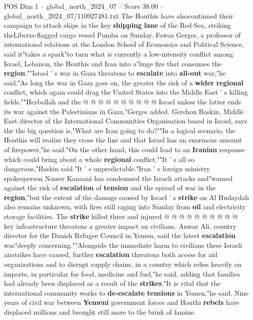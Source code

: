 \begin{textsample}{POS Dim 1 – global\_north\_2024\_07 – Score 38.00 – global\_north\_2024\_07/110927481.txt}
The Houthis have alsocontinued their campaign to attack ships in the key \textbf{shipping} \textbf{lane} of the Red Sea, striking theLiberia-flagged cargo vessel Pumba on Sunday.
Fawaz Gerges, a professor of international relations at the London School of Economics and Political Science, said it"takes a spark"to turn what is currently a low-intensity conflict among Israel, Lebanon, the Houthis and Iran into a"huge fire that consumes the \textbf{region}.""Israel ' s war in Gaza threatens to \textbf{escalate} into \textbf{all-out} war,"he said."As long the war in Gaza goes on, the greater the risk of a \textbf{wider} \textbf{regional} conflict, which again could drag the United States into the Middle East ' s killing fields.""Hezbollah and the @ @ @ @ @ @ @ @ @ @ Israel unless the latter ends its war against the Palestinians in Gaza,"Gerges added.
Gershon Baskin, Middle East director of the International Communities Organisation based in Israel, says the the big question is,"What are Iran going to do?""In a logical scenario, the Houthis will realize they cross the line and that Israel has an enormous amount of firepower,"he said."On the other hand, this could lead to an \textbf{Iranian} response which could bring about a whole \textbf{regional} conflict.""It ' s all so dangerous,"Baskin said."It ' s unpredictable."Iran ' s foreign ministry spokesperson Nasser Kanaani has condemned the Israeli attacks and"warned against the risk of \textbf{escalation} of \textbf{tension} and the spread of war in the \textbf{region},"but the extent of the damage caused by Israel ' s \textbf{strike} on Al Hudaydah also remains unknown, with fires still raging into Sunday from \textbf{oil} and electricity storage facilities.
The \textbf{strike} killed three and injured @ @ @ @ @ @ @ @ @ @ key infrastructure threatens a greater impact on civilians.
Anwar Ali, country director for the Danish Refugee Council in Yemen, said the latest \textbf{escalation} was"deeply concerning.""Alongside the immediate harm to civilians these Israeli airstrikes have caused, further \textbf{escalation} threatens both access for aid organizations and to disrupt supply chains, in a country which relies heavily on imports, in particular for food, medicine and fuel,"he said, adding that families had already been displaced as a result of the \textbf{strikes}."It is vital that the international community works to \textbf{de-escalate} \textbf{tensions} in Yemen,"he said.
Nine years of civil war between \textbf{Yemeni} government forces and Houthi \textbf{rebels} have displaced millions and brought still more to the brink of famine.

\end{textsample}
